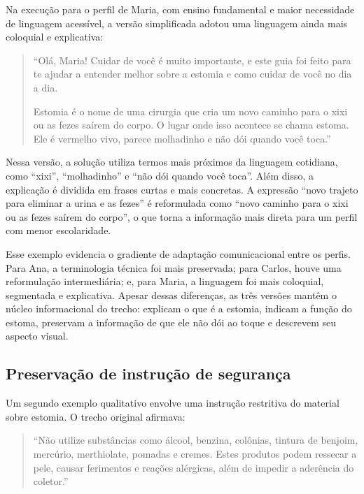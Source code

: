 Na execução para o perfil de Maria, com ensino fundamental e maior necessidade de linguagem acessível, a versão simplificada adotou uma linguagem ainda mais coloquial e explicativa:

\begin{quote}
``Olá, Maria! Cuidar de você é muito importante, e este guia foi feito para te ajudar a entender melhor sobre a estomia e como cuidar de você no dia a dia.

Estomia é o nome de uma cirurgia que cria um novo caminho para o xixi ou as fezes saírem do corpo. O lugar onde isso acontece se chama estoma. Ele é vermelho vivo, parece molhadinho e não dói quando você toca.''
\end{quote}

Nessa versão, a solução utiliza termos mais próximos da linguagem cotidiana, como ``xixi'', ``molhadinho'' e ``não dói quando você toca''. Além disso, a explicação é dividida em frases curtas e mais concretas. A expressão ``novo trajeto para eliminar a urina e as fezes'' é reformulada como ``novo caminho para o xixi ou as fezes saírem do corpo'', o que torna a informação mais direta para um perfil com menor escolaridade.

Esse exemplo evidencia o gradiente de adaptação comunicacional entre os perfis. Para Ana, a terminologia técnica foi mais preservada; para Carlos, houve uma reformulação intermediária; e, para Maria, a linguagem foi mais coloquial, segmentada e explicativa. Apesar dessas diferenças, as três versões mantêm o núcleo informacional do trecho: explicam o que é a estomia, indicam a função do estoma, preservam a informação de que ele não dói ao toque e descrevem seu aspecto visual.

\subsection{Preservação de instrução de segurança}
\label{subsec:preservacao-instrucao-seguranca}

Um segundo exemplo qualitativo envolve uma instrução restritiva do material sobre estomia. O trecho original afirmava:

\begin{quote}
``Não utilize substâncias como álcool, benzina, colônias, tintura de benjoim, mercúrio, merthiolate, pomadas e cremes. Estes produtos podem ressecar a pele, causar ferimentos e reações alérgicas, além de impedir a aderência do coletor.''
\end{quote}


